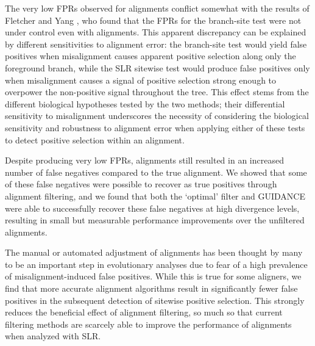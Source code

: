 \documentclass{article}
\begin{document}
The very low FPRs observed for \prankc alignments conflict somewhat
with the results of Fletcher and Yang
\citeyearpar{Fletcher2010Effect}, who found that the FPRs for the
branch-site test were not under control even with \prankc
alignments. This apparent discrepancy can be explained by different
sensitivities to alignment error: the branch-site test would yield
false positives when misalignment causes apparent positive selection
along only the foreground branch, while the SLR sitewise test would
produce false positives only when misalignment causes a signal of
positive selection strong enough to overpower the non-positive signal
throughout the tree. This effect stems from the different biological
hypotheses tested by the two methods; their differential sensitivity
to misalignment underscores the necessity of considering the
biological sensitivity and robustness to alignment error when applying
either of these tests to detect positive selection within an
alignment. 

Despite producing very low FPRs, \prankc alignments still resulted in
an increased number of false negatives compared to the true
alignment. We showed that some of these false negatives were possible
to recover as true positives through alignment filtering, and we found
that both the `optimal' filter and GUIDANCE were able to successfully
recover these false negatives at high divergence levels, resulting in
small but measurable performance improvements over the unfiltered
\prankc alignments.

The manual or automated adjustment of alignments has been thought by
many to be an important step in evolutionary analyses due to fear of a
high prevalence of misalignment-induced false positives. While this is
true for some aligners, we find that more accurate alignment
algorithms result in significantly fewer false positives in the
subsequent detection of sitewise positive selection. This strongly
reduces the beneficial effect of alignment filtering, so much so that
current filtering methods are scarcely able to improve the
performance of \prankc alignments when analyzed with SLR.
\end{document}
